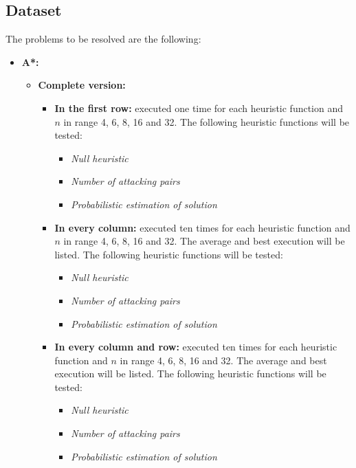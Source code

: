 \documentclass[]{llncs}
\begin{document}
\subsection{Dataset}\label{dataset}
The problems to be resolved are the following:
\begin{itemize}
    \item \textbf{A*:}
    \begin{itemize}
        \item \textbf{Complete version:}
        \begin{itemize}
            \item \textbf{In the first row:} executed one time for each heuristic function and $n$ in range 4, 6, 8, 16 and 32. The following heuristic functions will be tested:
            \begin{itemize}
                \item \textit{Null heuristic}
                \item \textit{Number of attacking pairs}
                \item \textit{Probabilistic estimation of solution}
            \end{itemize}
            \item \textbf{In every column:} executed ten times for each heuristic function and $n$ in range 4, 6, 8, 16 and 32. The average and best execution will be listed. The following heuristic functions will be tested:
            \begin{itemize}
                \item \textit{Null heuristic}
                \item \textit{Number of attacking pairs}
                \item \textit{Probabilistic estimation of solution}
            \end{itemize}
            \item \textbf{In every column and row:} executed ten times for each heuristic function and $n$ in range 4, 6, 8, 16 and 32. The average and best execution will be listed. The following heuristic functions will be tested:
            \begin{itemize}
                \item \textit{Null heuristic}
                \item \textit{Number of attacking pairs}
                \item \textit{Probabilistic estimation of solution}
            \end{itemize}
        \end{itemize}

\end{itemize}
\end{itemize}
\end{document}
